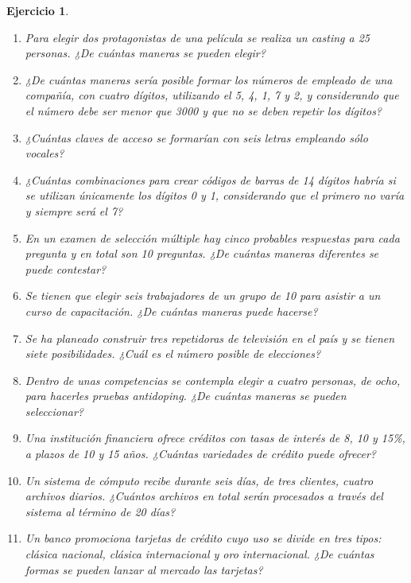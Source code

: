 \documentclass[12pt,twoside]{article}
\newtheorem{Ejer}{Ejercicio}
\begin{document}
\begin{Ejer}
\begin{enumerate}
\item Para elegir dos protagonistas de una película se realiza un casting a 25 personas. ¿De cuántas maneras se pueden elegir?

\item ¿De cuántas maneras sería posible formar los números de empleado de una compañía, con cuatro dígitos, utilizando el 5, 4, 1, 7 y 2, y considerando que el número debe ser menor que 3000 y que no se deben repetir los dígitos?

\item ¿Cuántas claves de acceso se formarían con seis letras empleando sólo vocales?

\item ¿Cuántas combinaciones para crear códigos de barras de 14 dígitos habría si se utilizan únicamente los dígitos 0 y 1, considerando que el primero no varía y siempre será el 7?

\item En un examen de selección múltiple hay cinco probables respuestas para cada pregunta y en total son 10 preguntas. ¿De cuántas maneras diferentes se puede contestar?

\item Se tienen que elegir seis trabajadores de un grupo de 10 para asistir a un curso de capacitación. ¿De cuántas maneras puede hacerse?

\item Se ha planeado construir tres repetidoras de televisión en el país y se tienen siete posibilidades. ¿Cuál es el número posible de elecciones?

\item Dentro de unas competencias se contempla elegir a cuatro personas, de ocho, para hacerles pruebas antidoping. ¿De cuántas maneras se pueden seleccionar?

\item Una institución financiera ofrece créditos con tasas de interés de 8, 10 y 15\%, a plazos de 10 y 15 años. ¿Cuántas variedades de crédito puede ofrecer?

\item Un sistema de cómputo recibe durante seis días, de tres clientes, cuatro archivos diarios. ¿Cuántos archivos en total serán procesados a través del sistema al término de 20 días?

\item Un banco promociona tarjetas de crédito cuyo uso se divide en tres tipos: clásica nacional, clásica internacional y oro internacional. ¿De cuántas formas se pueden lanzar al mercado las tarjetas?


\end{enumerate}
\end{Ejer}
\end{document}
